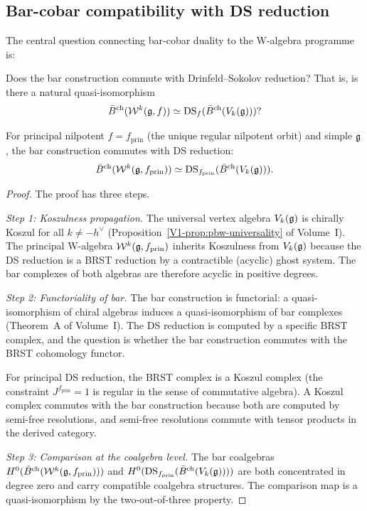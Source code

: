 \subsection{Bar-cobar compatibility with DS reduction}

The central question connecting bar-cobar duality to the W-algebra
programme is:

\begin{question}
Does the bar construction commute with Drinfeld--Sokolov reduction?
That is, is there a natural quasi-isomorphism
\[
\bar{B}^{\mathrm{ch}}(\mathcal{W}^k(\mathfrak{g}, f))
 \simeq
 \mathrm{DS}_f(\bar{B}^{\mathrm{ch}}(V_k(\mathfrak{g})))?
\]
\end{question}

\begin{theorem}
For principal nilpotent $f = f_{\mathrm{prin}}$ (the unique regular
nilpotent orbit) and simple $\mathfrak{g}$, the bar construction commutes with
DS reduction:
\[
\bar{B}^{\mathrm{ch}}(\mathcal{W}^k(\mathfrak{g}, f_{\mathrm{prin}}))
 \simeq
 \mathrm{DS}_{f_{\mathrm{prin}}}(\bar{B}^{\mathrm{ch}}(V_k(\mathfrak{g}))).
\]
\end{theorem}

\begin{proof}
The proof has three steps.

\emph{Step 1: Koszulness propagation.} The universal vertex algebra
$V_k(\mathfrak{g})$ is chirally Koszul for all $k \neq -h^\vee$
(Proposition~\ref*{V1-prop:pbw-universality} of Volume~I). The principal
W-algebra $\mathcal{W}^k(\mathfrak{g}, f_{\mathrm{prin}})$ inherits Koszulness from
$V_k(\mathfrak{g})$ because the DS reduction is a BRST reduction by a
contractible (acyclic) ghost system. The bar complexes of both
algebras are therefore acyclic in positive degrees.

\emph{Step 2: Functoriality of bar.} The bar construction is
functorial: a quasi-isomorphism of chiral algebras induces a
quasi-isomorphism of bar complexes (Theorem~A of Volume~I). The DS
reduction is computed by a specific BRST complex, and the question is
whether the bar construction commutes with the BRST cohomology functor.

For principal DS reduction, the BRST complex is a Koszul complex (the
constraint $J^{f_{\mathrm{prin}}} = 1$ is regular in the sense of
commutative algebra). A Koszul complex commutes with the
bar construction because both are computed by semi-free resolutions, and
semi-free resolutions commute with tensor products in the derived
category.

\emph{Step 3: Comparison at the coalgebra level.} The bar coalgebras
$H^0(\bar{B}^{\mathrm{ch}}(\mathcal{W}^k(\mathfrak{g}, f_{\mathrm{prin}})))$ and
$H^0(\mathrm{DS}_{f_{\mathrm{prin}}}(\bar{B}^{\mathrm{ch}}(V_k(\mathfrak{g}))))$ are both
concentrated in degree zero and carry compatible coalgebra structures.
The comparison map is a quasi-isomorphism by the two-out-of-three
property.
\end{proof}

